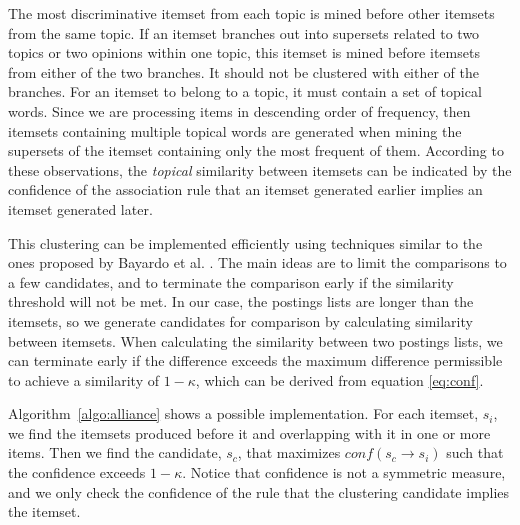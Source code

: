 \documentclass{sig-alternate}
\begin{document}
The most discriminative itemset from each topic 
is mined 
before other itemsets from the same topic.
If an itemset branches out into supersets related to two topics 
or two opinions within one topic, this itemset is 
mined before itemsets from 
either of the two branches. It should not 
be clustered with either of the branches.
For an itemset to belong to a topic, it must contain a set of topical words. 
Since we are processing items in descending order of frequency, 
then itemsets containing multiple topical words are generated
when mining the supersets of the itemset containing only 
the most frequent of them.
According to these observations, 
the \emph{topical} similarity between itemsets
can be indicated by
the confidence of 
the association rule that
an itemset generated earlier implies 
an itemset generated later.


This clustering can be implemented efficiently using techniques similar to
the ones proposed by Bayardo et al. \cite{bayardo2007scaling}.
The main ideas are to limit the comparisons to a few candidates,
and to terminate the comparison early if the similarity threshold will not
be met.
In our case, the postings lists are longer than the itemsets,
so we generate candidates for comparison by calculating similarity between
itemsets.
When calculating the similarity between two postings lists,
we can terminate early if the difference exceeds the maximum difference
permissible to achieve a similarity of $1-\kappa$,
which can be derived from equation \ref{eq:conf}. 

Algorithm~\ref{algo:alliance}  shows a possible implementation.
For each itemset, $s_i$, we find the itemsets produced before it
and overlapping with it in one or more items.
Then we find the candidate, $s_c$, that maximizes
$conf(s_c \rightarrow s_i)$ such that the confidence exceeds $1-\kappa$.
Notice that confidence is not a symmetric measure,
and we only check the confidence of the rule that the clustering candidate
implies the itemset. 
\end{document}

